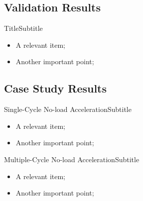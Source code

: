 \subsection{Validation Results}

    \begin{frame}{Title}{Subtitle}\vspace*{-2em}
        \begin{itemize}
            \item<2->  A \alert{relevant} item;
            \item<3->  Another \alert{important} point;
        \end{itemize}
    \end{frame}

\subsection{Case Study Results}

    \begin{frame}{Single-Cycle No-load Acceleration}{Subtitle}\vspace*{-2em}
        \begin{itemize}
            \item<2->  A \alert{relevant} item;
            \item<3->  Another \alert{important} point;
        \end{itemize}
    \end{frame}

    \begin{frame}{Multiple-Cycle No-load Acceleration}{Subtitle}\vspace*{-2em}
        \begin{itemize}
            \item<2->  A \alert{relevant} item;
            \item<3->  Another \alert{important} point;
        \end{itemize}
    \end{frame}

